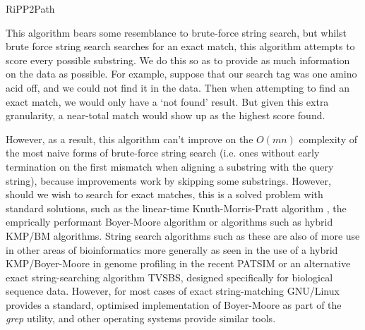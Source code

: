 \documentclass{l4proj}
\newcommand{\cit}[1]{\citep{#1}}
\begin{document}
\begin{algorithm}
    \DontPrintSemicolon

\caption{RiPP2Path}\label{alg:ripp2path}
\end{algorithm}

This algorithm bears some resemblance to brute-force string search, but whilst brute force string search searches for an exact match, this algorithm attempts to score every possible substring. We do this so as to provide as much information on the data as possible. For example, suppose that our search tag was one amino acid off, and we could not find it in the data. Then when attempting to find an exact match, we would only have a `not found' result. But given this extra granularity, a near-total match would show up as the highest score found. 

However, as a result, this algorithm can't improve on the \(O(mn)\) complexity of the most naive forms of brute-force string search (i.e. ones without early termination on the first mismatch when aligning a substring with the query string), because improvements work by skipping some substrings. However, should we wish to search for exact matches, this is a solved problem with standard solutions, such as the linear-time Knuth-Morris-Pratt algorithm \cit{kmp}, the emprically performant Boyer-Moore algorithm \cit{boyer-moore} or algorithms such as hybrid KMP/BM algorithms. \cit{kmpbm} \cit{kmpbmtwo} String search algorithms such as these are also of more use in other areas of bioinformatics more generally as seen in the use of a hybrid KMP/Boyer-Moore in genome profiling in the recent PATSIM \cit{patsim} or an alternative exact string-searching algorithm TVSBS, \cit{tvsbs} designed specifically for biological sequence data. However, for most cases of exact string-matching GNU/Linux provides a standard, optimised implementation of Boyer-Moore as part of the \textit{grep} utility, and other operating systems provide similar tools.
\end{document}

